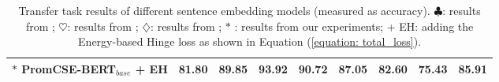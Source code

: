 \documentclass[11pt]{article}
\begin{document}
\begin{table*}[]
\begin{tabular}{lllllllll}
$*$ PromCSE-BERT$_{base}$ + EH        &81.80       &89.85       &93.92       &\textbf{90.72}       &87.05       &82.60       &75.43       &85.91 \\
\bottomrule
\end{tabular}
\caption{\label{tab: transfer tasks}
Transfer task results of different sentence embedding models (measured as accuracy). $\clubsuit$: results from \cite{ReimersG19sbert}; $\heartsuit$: results from \cite{zhang-etal-2020-isbert}; $\diamondsuit$: results from \cite{gao2021simcse}; $*$ : results from our experiments; + EH: adding the Energy-based Hinge loss as shown in Equation (\ref{equation: total_loss}).
}
\end{table*}
\end{document}
